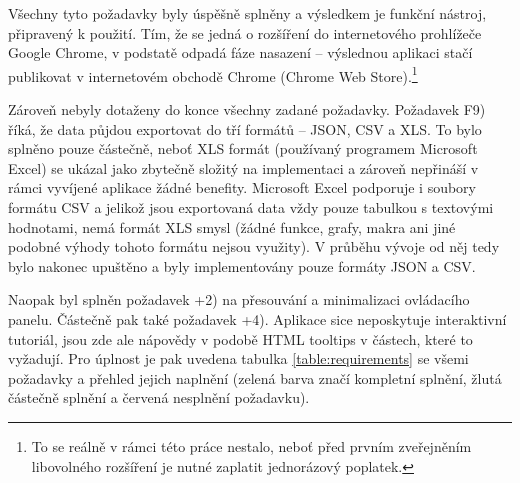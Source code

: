 \documentclass[thesis=B,czech]{FITthesis}[2012/06/26]
\begin{document}
Všechny tyto požadavky byly úspěšně splněny a výsledkem je funkční nástroj, připravený k použití. Tím, že se jedná o rozšíření do internetového prohlížeče Google Chrome, v podstatě odpadá fáze nasazení -- výslednou aplikaci stačí publikovat v internetovém obchodě Chrome (Chrome Web Store).\footnote{To se reálně v rámci této práce nestalo, neboť před prvním zveřejněním libovolného rozšíření je nutné zaplatit jednorázový poplatek.}

Zároveň nebyly dotaženy do konce všechny zadané požadavky. Požadavek F9) říká, že data půjdou exportovat do tří formátů -- JSON, CSV a XLS. To bylo splněno pouze částečně, neboť XLS formát (používaný programem Microsoft Excel) se ukázal jako zbytečně složitý na implementaci a zároveň nepřináší v rámci vyvíjené aplikace žádné benefity. Microsoft Excel podporuje i soubory formátu CSV a jelikož jsou exportovaná data vždy pouze tabulkou s textovými hodnotami, nemá formát XLS smysl (žádné funkce, grafy, makra ani jiné podobné výhody tohoto formátu nejsou využity). V průběhu vývoje od něj tedy bylo nakonec upuštěno a byly implementovány pouze formáty JSON a CSV.

Naopak byl splněn požadavek +2) na přesouvání a minimalizaci ovládacího panelu. Částečně pak také požadavek +4). Aplikace sice neposkytuje interaktivní tutoriál, jsou zde ale nápovědy v podobě HTML tooltips v částech, které to vyžadují. Pro úplnost je pak uvedena tabulka \ref{table:requirements} se všemi požadavky a přehled jejich naplnění (zelená barva značí kompletní splnění, žlutá částečně splnění a červená nesplnění požadavku).
\end{document}
